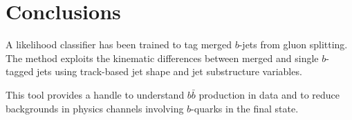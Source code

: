 %
%
\chapter{Conclusions}

A likelihood classifier has been trained to tag merged $b$-jets from gluon splitting. The method exploits the kinematic differences between merged and single $b$-tagged jets using track-based jet shape and jet substructure variables.   

This tool provides a handle to understand $b \bar{b}$ production in data and to reduce backgrounds in physics channels involving $b$-quarks in the final state.





